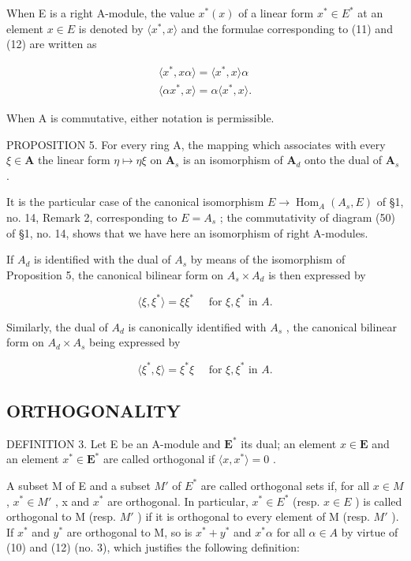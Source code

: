 When E is a right A-module, the value \(x^{*}(x)\) of a linear form \(x^{*} \in E^{*}\) at an element \(x \in E\) is denoted by \(\langle x^{*}, x \rangle\) and the formulae corresponding to (11) and (12) are written as

\[
\begin{array}{l} \langle x ^ {*}, x \alpha \rangle = \langle x ^ {*}, x \rangle \alpha \\ \langle \alpha x ^ {*}, x \rangle = \alpha \langle x ^ {*}, x \rangle . \end{array}
\]

When A is commutative, either notation is permissible.

PROPOSITION 5. For every ring A, the mapping which associates with every \(\xi\in\mathbf{A}\) the linear form \(\eta\mapsto\eta\xi\) on \(\mathbf{A}_{s}\) is an isomorphism of \(\mathbf{A}_{d}\) onto the dual of \(\mathbf{A}_{s}\) .

It is the particular case of the canonical isomorphism \(E \to \operatorname{Hom}_{A}(A_{s}, E)\) of §1, no. 14, Remark 2, corresponding to \(E = A_{s}\) ; the commutativity of diagram (50) of §1, no. 14, shows that we have here an isomorphism of right A-modules.

If \(A_{d}\) is identified with the dual of \(A_{s}\) by means of the isomorphism of Proposition 5, the canonical bilinear form on \(A_{s} \times A_{d}\) is then expressed by

\[
\langle \xi , \xi^ {*} \rangle = \xi \xi^ {*} \quad \text { for } \xi , \xi^ {*} \text { in } A.\tag{13}
\]

Similarly, the dual of \(A_{d}\) is canonically identified with \(A_{s}\) , the canonical bilinear form on \(A_{d} \times A_{s}\) being expressed by

\[
\langle \xi^ {*}, \xi \rangle = \xi^ {*} \xi \quad \text { for } \xi , \xi^ {*} \text { in } A.\tag{14}
\]

\subsection{ORTHOGONALITY}

DEFINITION 3. Let E be an A-module and \(\mathbf{E}^*\) its dual; an element \(x \in \mathbf{E}\) and an element \(x^* \in \mathbf{E}^*\) are called orthogonal if \(\langle x, x^* \rangle = 0\) .

A subset M of E and a subset \(M'\) of \(E^{*}\) are called orthogonal sets if, for all \(x \in M\) , \(x^{*} \in M'\) , x and \(x^{*}\) are orthogonal. In particular, \(x^{*} \in E^{*}\) (resp. \(x \in E\) ) is called orthogonal to M (resp. \(M'\) ) if it is orthogonal to every element of M (resp. \(M'\) ). If \(x^{*}\) and \(y^{*}\) are orthogonal to M, so is \(x^{*} + y^{*}\) and \(x^{*}\alpha\) for all \(\alpha \in A\) by virtue of (10) and (12) (no. 3), which justifies the following definition:

